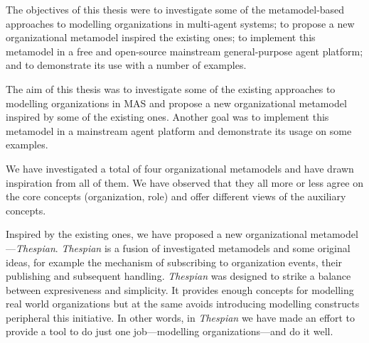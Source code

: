 


The objectives of this thesis were to investigate some of the metamodel-based approaches to modelling organizations in multi-agent systems; to propose a new organizational metamodel inspired the existing ones; to implement this metamodel in a free and open-source mainstream general-purpose agent platform; and to demonstrate its use with a number of examples. 

The aim of this thesis was to investigate some of the existing approaches to modelling organizations in MAS and propose a new organizational metamodel inspired by some of the existing ones.
Another goal was to implement this metamodel in a mainstream agent platform and demonstrate its usage on some examples.

We have investigated a total of four organizational metamodels and have drawn inspiration from all of them.
We have observed that they all more or less agree on the core concepts (organization, role) and offer different views of the auxiliary concepts.

Inspired by the existing ones, we have proposed a new organizational metamodel---\textit{Thespian}.
\textit{Thespian} is a fusion of investigated metamodels and some original ideas, for example the mechanism of subscribing to organization events, their publishing and subsequent handling.
\textit{Thespian} was designed to strike a balance between expresiveness and simplicity.
It provides enough concepts for modelling real world organizations but at the same avoids introducing modelling constructs peripheral this initiative.
In other words, in \textit{Thespian} we have made an effort to provide a tool to do just one job---modelling organizations---and do it well.

